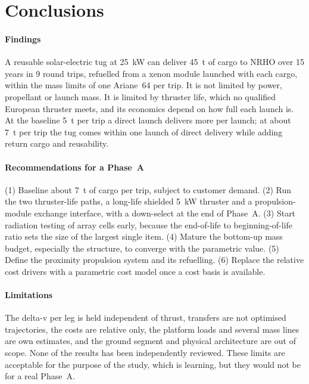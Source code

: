 \documentclass[11pt,a4paper]{article}
\begin{document}
\section{Conclusions}\label{sec:conclusions}

\paragraph{Findings} A reusable solar-electric tug at 25~kW can deliver 45~t of cargo to NRHO over 15 years in 9 round trips, refuelled from a xenon module launched with each cargo, within the mass limits of one Ariane~64 per trip. It is not limited by power, propellant or launch mass. It is limited by thruster life, which no qualified European thruster meets, and its economics depend on how full each launch is. At the baseline 5~t per trip a direct launch delivers more per launch; at about 7~t per trip the tug comes within one launch of direct delivery while adding return cargo and reusability.

\paragraph{Recommendations for a Phase~A} (1) Baseline about 7~t of cargo per trip, subject to customer demand. (2) Run the two thruster-life paths, a long-life shielded 5~kW thruster and a propulsion-module exchange interface, with a down-select at the end of Phase~A. (3) Start radiation testing of array cells early, because the end-of-life to beginning-of-life ratio sets the size of the largest single item. (4) Mature the bottom-up mass budget, especially the structure, to converge with the parametric value. (5) Define the proximity propulsion system and its refuelling. (6) Replace the relative cost drivers with a parametric cost model once a cost basis is available.

\paragraph{Limitations} The delta-v per leg is held independent of thrust, transfers are not optimised trajectories, the costs are relative only, the platform loads and several mass lines are own estimates, and the ground segment and physical architecture are out of scope. None of the results has been independently reviewed. These limits are acceptable for the purpose of the study, which is learning, but they would not be for a real Phase~A.
\end{document}
